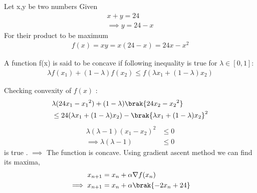 Let x,y be two numbers
Given
\begin{align}
  x+y=24\\
  \implies y=24-x
\end{align}
For their product to be maximum
\begin{align}
    f(x)=xy=x(24-x)=24x-x^2 \label{aug/2/4/eq:1}
\end{align}
\begin{lemma}
A function f(x) is said to be concave if following inequality is true for $\lambda \in [0,1] :$  \label{aug/2/4/lemma1}
\begin{align}
    \lambda f(x_1) + (1-\lambda)f(x_2) \leq f(\lambda x_1 + (1-\lambda)x_2)
\end{align}
\end{lemma}
Checking convexity of $f(x)$ :
\begin{align}
    &\lambda(24{x_1}-{x_1}^2) + 
    (1-\lambda)\brak{24 {x_2}- {x_2}^2} \\ &\leq
    24(\lambda x_1 + (1-\lambda)x_2)-\brak{\lambda x_1 + (1-\lambda)x_2}^2 
\end{align}
\begin{align}
    \lambda(\lambda - 1)({x_1} -{x_2})^2 &\leq 0\\
    \implies \lambda(\lambda - 1)&\leq 0
\end{align}is true .
$\implies$
The function is concave.
Using gradient ascent method we can find its maxima,
    \begin{align}
        x_{n+1} &= x_n + \alpha \nabla f(x_n) \\
        \implies x_{n+1} &= x_n + \alpha \brak{-2x_n+24}
    \end{align}
    
